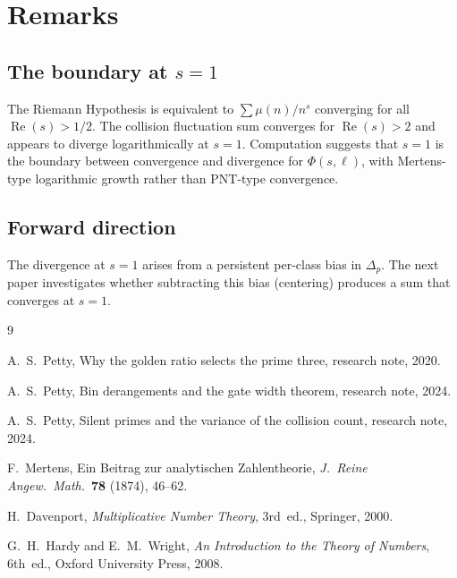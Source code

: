\documentclass[12pt]{amsart}
\theoremstyle{definition}
\theoremstyle{remark}
\begin{document}
\section{Remarks}

\subsection*{The boundary at $s = 1$}

The Riemann Hypothesis is equivalent to $\sum \mu(n)/n^s$
converging for all $\operatorname{Re}(s) > 1/2$. The collision
fluctuation sum converges for $\operatorname{Re}(s) > 2$ and
appears to diverge logarithmically at $s = 1$.
Computation suggests that $s = 1$ is the boundary between
convergence and divergence for $\Phi(s, \ell)$, with
Mertens-type logarithmic growth rather than PNT-type
convergence.

\subsection*{Forward direction}

The divergence at $s = 1$ arises from a persistent per-class
bias in $\Delta_p$. The next paper investigates whether
subtracting this bias (centering) produces a sum that converges
at $s = 1$.

\begin{thebibliography}{9}

A.~S.~Petty,
Why the golden ratio selects the prime three,
research note, 2020.

A.~S.~Petty,
Bin derangements and the gate width theorem,
research note, 2024.

A.~S.~Petty,
Silent primes and the variance of the collision count,
research note, 2024.

F.~Mertens,
Ein Beitrag zur analytischen Zahlentheorie,
\emph{J.\ Reine Angew.\ Math.}\ \textbf{78} (1874), 46--62.

H.~Davenport,
\emph{Multiplicative Number Theory},
3rd~ed., Springer, 2000.

G.~H.~Hardy and E.~M.~Wright,
\emph{An Introduction to the Theory of Numbers},
6th~ed., Oxford University Press, 2008.

\end{thebibliography}
\end{document}
